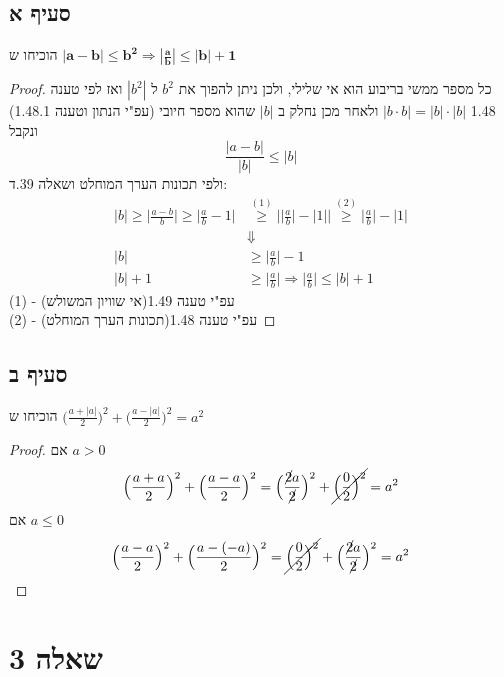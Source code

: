 \documentclass{article}
\begin{document}
	\subsection*{סעיף א}
	הוכיחו ש
	$\bm{|a-b| \leq b^2 \Rightarrow |\frac{a}{b}| \leq |b| + 1}$

	\begin{proof}

		כל מספר ממשי בריבוע הוא אי שלילי, ולכן ניתן להפוך את $b^2$ ל $|b^2|$ ואז לפי טענה 1.48 $|b \cdot b| = |b|\cdot|b|$ ולאחר מכן נחלק ב $|b|$ שהוא מספר חיובי (עפ"י הנתון וטענה 1.48.1) ונקבל
		\[ \frac{|a-b| }{|b|} \leq |b| \]
		ולפי תכונות הערך המוחלט ושאלה 39.ד:
		\begin{align*}
			|b| \geq \Big| \frac{a-b}{b} \Big|
			\geq  \Big| \frac{a}{b}-1 \Big|
			&\overset{(1)}{\geq}
		 	\bigg| \Big| \frac{a}{b} \Big| - |1| \bigg|
			 \overset{(2)}{\geq}
		 	\Big| \frac{a}{b} \Big| - |1| \\
			 &\Downarrow \\
			|b| &\geq \Big| \frac{a}{b} \Big| -1 \\
			|b| + 1 &\geq \Big| \frac{a}{b}  \Big| \Rightarrow
			\Big| \frac{a}{b} \Big| \leq |b| + 1
		\end{align*}
		(1) - עפ"י טענה 1.49(אי שוויון המשולש) \\
		(2) - עפ"י טענה 1.48(תכונות הערך המוחלט)
	\end{proof}

	\subsection*{סעיף ב}
	הוכיחו ש
	$\big( \frac{a + |a|}{2} \big)^2 + \big( \frac{a - |a|}{2} \big)^2 = a^2$
	\begin{proof}
		אם $a > 0$
		\[
			\Big( \frac{a+a}{2} \Big)^2 + \Big( \frac{a-a}{2} \Big) ^2 =
			\Big( \frac{\cancel{2}a}{\cancel{2}} \Big)^2 + \cancel{\Big( \frac{0}{2} \Big)^2} = a^2
		\]
				אם $a \leq 0$
		\[
		\Big( \frac{a-a}{2} \Big)^2 + \Big( \frac{a-(-a)}{2} \Big) ^2 =
		\cancel{\Big( \frac{0}{2} \Big)^2} + \Big( \frac{\cancel{2}a}{\cancel{2}} \Big)^2 = a^2
		\]
	\end{proof}

	\pagebreak
	\section*{שאלה 3}
\end{document}
